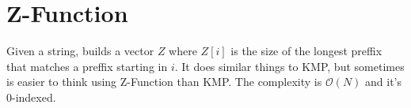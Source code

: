 \section{Z-Function}
Given a string, builds a vector $Z$ where $Z[i]$ is the size of the longest preffix that matches a preffix starting in $i$. 
It does similar things to KMP, but sometimes is easier to think using Z-Function than KMP. The complexity is $\mathcal{O}(N)$ and it's 
$0$-indexed.

